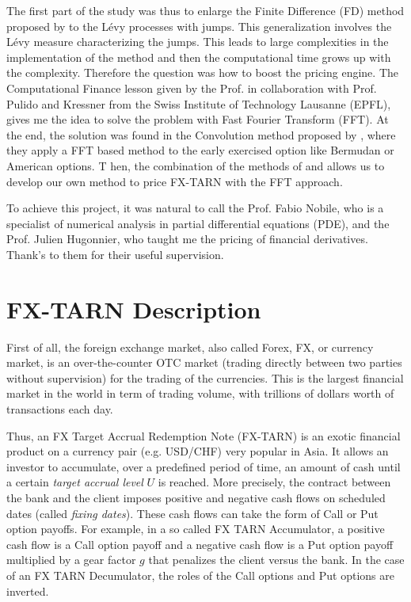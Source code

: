 The first part of the study was thus to enlarge the Finite Difference (FD) method proposed by \citeauthor{LS15} to the L\'evy processes with jumps. This generalization involves the L\'evy measure characterizing the jumps. This leads to large complexities in the implementation of the method and then the computational time grows up with the complexity. Therefore the question was how to boost the pricing engine. The Computational Finance lesson given by the Prof. \citeauthor{Nob15} \cite{Nob15} in collaboration with Prof. Pulido and Kressner from the Swiss Institute of Technology Lausanne (EPFL), gives me the idea to solve the problem with Fast Fourier Transform (FFT). At the end, the solution was found in the Convolution method proposed by \citeauthor{Lor+08} \citeyearpar{Lor+08} \cite{Lor+08}, where they apply a FFT based method to the early exercised option like Bermudan or American options. T hen, the combination of the methods of \citeauthor{LS15} and \citeauthor{Lor+08} allows us to develop our own method to price FX-TARN with the FFT approach.

To achieve this project, it was natural to call the Prof. Fabio Nobile, who is a specialist of numerical analysis in partial differential equations (PDE), and the Prof. Julien Hugonnier, who taught me the pricing of financial derivatives. Thank's to them for their useful supervision.

\section{FX-TARN Description}
\label{sec:intro:description}
First of all, the foreign exchange market, also called Forex, FX, or currency market, is an over-the-counter OTC market (trading directly between two parties without supervision) for the trading of the currencies. This is the largest financial market in the world in term of trading volume, with trillions of dollars worth of transactions each day. 

Thus, an FX Target Accrual Redemption Note (FX-TARN) is an exotic financial product on a currency pair (e.g. USD/CHF) very popular in Asia. It allows an investor to accumulate, over a predefined period of time, an amount of cash until a certain \textit{target accrual level} $U$ is reached. More precisely, the contract between the bank and the client imposes positive and negative cash flows on scheduled dates (called \textit{fixing dates}). These cash flows can take the form of Call or Put option payoffs. For example, in a so called FX TARN Accumulator, a positive cash flow is a Call option payoff and a negative cash flow is a Put option payoff multiplied by a gear factor $g$ that penalizes the client versus the bank. In the case of an FX TARN Decumulator, the roles of the Call options and Put options are inverted.

